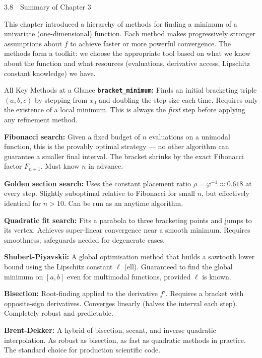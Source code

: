 \documentclass[aspectratio=169,10pt]{beamer}
\begin{document}
\begin{frame}[allowframebreaks]{3.8\ \ Summary of Chapter 3}

  This chapter introduced a hierarchy of methods for finding a minimum of a
  univariate (one-dimensional) function.  Each method makes progressively
  stronger assumptions about $f$ to achieve faster or more powerful convergence.
  The methods form a toolkit: we choose the appropriate tool based on what we
  know about the function and what resources (evaluations, derivative access,
  Lipschitz constant knowledge) we have.

  \begin{block}{All Key Methods at a Glance}
    \textbf{\texttt{bracket\_minimum}:} Finds an initial bracketing triple
    $(a, b, c)$ by stepping from $x_0$ and doubling the step size each time.
    Requires only the existence of a local minimum.  This is always the
    \emph{first} step before applying any refinement method.

    \medskip
    \textbf{Fibonacci search:} Given a fixed budget of $n$ evaluations on a
    unimodal function, this is the provably optimal strategy --- no other
    algorithm can guarantee a smaller final interval.  The bracket shrinks
    by the exact Fibonacci factor $F_{n+1}$.  Must know $n$ in advance.

    \medskip
    \textbf{Golden section search:} Uses the constant placement ratio
    $\rho = \varphi^{-1} \approx 0.618$ at every step.  Slightly suboptimal
    relative to Fibonacci for small $n$, but effectively identical for
    $n > 10$.  Can be run as an anytime algorithm.

    \medskip
    \textbf{Quadratic fit search:} Fits a parabola to three bracketing points
    and jumps to its vertex.  Achieves super-linear convergence near a smooth
    minimum.  Requires smoothness; safeguards needed for degenerate cases.

    \medskip
    \textbf{Shubert-Piyavskii:} A global optimisation method that builds a
    sawtooth lower bound using the Lipschitz constant $\ell$ (ell).
    Guaranteed to find the global minimum on $[a, b]$ even for multimodal
    functions, provided $\ell$ is known.

    \medskip
    \textbf{Bisection:} Root-finding applied to the derivative $f'$.
    Requires a bracket with opposite-sign derivatives.  Converges linearly
    (halves the interval each step).  Completely robust and predictable.

    \medskip
    \textbf{Brent-Dekker:} A hybrid of bisection, secant, and inverse
    quadratic interpolation.  As robust as bisection, as fast as quadratic
    methods in practice.  The standard choice for production scientific code.
  \end{block}


\end{frame}
\end{document}
